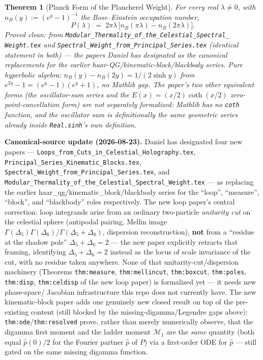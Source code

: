 \documentclass{report}
\newtheorem{theorem}{Theorem}[chapter]
\theoremstyle{definition}
\begin{document}
\begin{theorem}[Planck Form of the Plancherel Weight]
  \label{thm:planck-form-plancherel}
  \leanok
  For every real $\lambda \neq 0$, with $n_B(y) := (e^y-1)^{-1}$ the Bose--Einstein
  occupation number,
  \[
    P(\lambda) \;=\; 2\pi\lambda\,\bigl[n_B(\pi\lambda) - n_B(2\pi\lambda)\bigr].
  \]
  \emph{Proved clean}: from \texttt{Modular\_Thermality\_of\_the\_Celestial\_Spectral\_
  Weight.tex} and \texttt{Spectral\_Weight\_from\_Principal\_Series.tex} (identical
  statement in both) --- the papers Daniel has designated as the canonical replacements
  for the earlier haar-QG/kinematic-block/blackbody series. Pure hyperbolic algebra:
  $n_B(y) - n_B(2y) = 1/(2\sinh y)$ from $e^{2y}-1=(e^y-1)(e^y+1)$, no Mathlib gap. The
  paper's two other equivalent forms (the oscillator-sum series and the
  $E(x)=(x/2)\coth(x/2)$ zero-point-cancellation form) are not separately formalized:
  Mathlib has no \texttt{coth} function, and the oscillator sum is definitionally the
  same geometric series already inside \texttt{Real.sinh}'s own definition.
\end{theorem}

\textbf{Canonical-source update (2026-08-23).} Daniel has designated four new papers ---
\texttt{Loops\_from\_Cuts\_in\_Celestial\_Holography.tex},
\texttt{Principal\_Series\_Kinematic\_Blocks.tex},
\texttt{Spectral\_Weight\_from\_Principal\_Series.tex}, and
\texttt{Modular\_Thermality\_of\_the\_Celestial\_Spectral\_Weight.tex} --- as replacing the
earlier haar\_qg/kinematic\_block/blackbody series for the ``loop'', ``measure'', ``block'',
and ``blackbody'' roles respectively. The new loop paper's central correction: loop
integrands arise from an ordinary two-particle \emph{unitarity cut} on the celestial sphere
(antipodal pairing, Mellin image $\Gamma(\Delta_5)\Gamma(\Delta_6)/\Gamma(\Delta_5+\Delta_6)$,
dispersion reconstruction), \textbf{not} from a ``residue at the shadow pole'' $\Delta_5+
\Delta_6=2$ --- the new paper explicitly retracts that framing, identifying $\Delta_5+
\Delta_6=2$ instead as the locus of scale invariance of the cut, with no residue taken
anywhere. None of that unitarity-cut/dispersion machinery (Theorems \texttt{thm:measure},
\texttt{thm:mellincut}, \texttt{thm:boxcut}, \texttt{thm:poles}, \texttt{thm:disp},
\texttt{thm:celdisp} of the new loop paper) is formalized yet --- it needs new phase-space/
Jacobian infrastructure this repo does not currently have. The new kinematic-block paper adds
one genuinely new closed result on top of the pre-existing content (still blocked by the
missing-digamma/Legendre gaps above): \texttt{thm:ode}/\texttt{thm:resolved} prove, rather
than merely numerically observe, that the digamma first moment and the ladder moment
$\mathcal M_1$ are the \emph{same} quantity (both equal $\hat p(0)/2$ for the Fourier
partner $\hat p$ of $P$) via a first-order ODE for $\hat p$ --- still gated on the same
missing digamma function.
\end{document}
